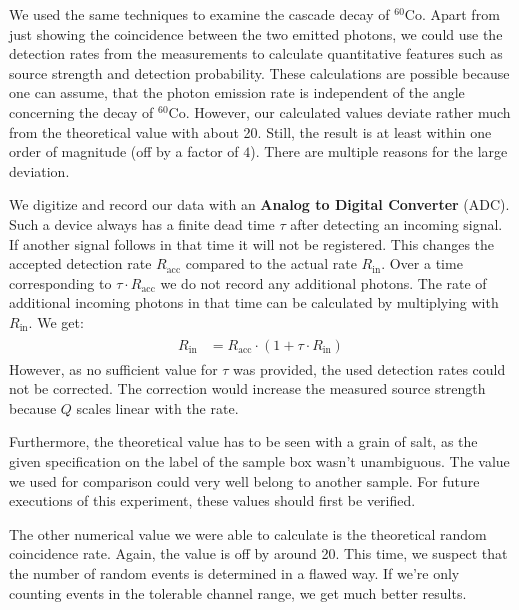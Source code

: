 %
\par
%
We used the same techniques to examine the cascade decay of $^{60}\text{Co}$.
Apart from just showing the coincidence between the two emitted photons, we could use the detection rates from the measurements to calculate quantitative features such as source strength and detection probability.
These calculations are possible because one can assume, that the photon emission rate is independent of the angle concerning the decay of $^{60}\text{Co}$.
However, our calculated values deviate rather much from the theoretical value with about \SI{20}{\sigma}.
Still, the result is at least within one order of magnitude (off by a factor of $4$).
There are multiple reasons for the large deviation.
%
\par
%
We digitize and record our data with an \textbf{Analog to Digital Converter} (ADC).
Such a device always has a finite dead time $\tau$ after detecting an incoming signal.
If another signal follows in that time it will not be registered.
This changes the accepted detection rate $R_{\text{acc}}$ compared to the actual rate $R_{\text{in}}$.
Over a time corresponding to $\tau \cdot R_{\text{acc}}$ we do not record any additional photons.
The rate of additional incoming photons in that time can be calculated by multiplying with $R_{\text{in}}$.
We get:
\begin{align}
    \label{eq:DeadTime}
    \begin{split}
        R_{\text{in}} &= R_{\text{acc}} \cdot (1 + \tau \cdot R_{\text{in}} )
    \end{split}
\end{align}
%
However, as no sufficient value for $\tau$ was provided, the used detection rates could not be corrected.
The correction would increase the measured source strength because $Q$ scales linear with the rate.
%
\par
%
Furthermore, the theoretical value has to be seen with a grain of salt, as the given specification on the label of the sample box wasn't unambiguous.
The value we used for comparison could very well belong to another sample.
For future executions of this experiment, these values should first be verified.
%
\par
%
The other numerical value we were able to calculate is the theoretical random coincidence rate.
Again, the value is off by around \SI{20}{\sigma}.
This time, we suspect that the number of random events is determined in a flawed way.
If we're only counting events in the tolerable channel range, we get much better results.
